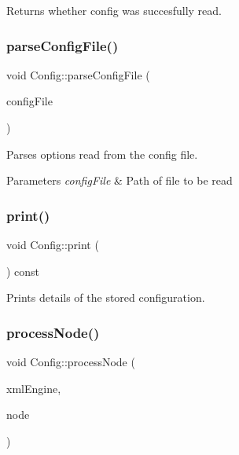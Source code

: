 Returns whether config was succesfully read. 

\mbox{\label{class_config_a3092a6e3ba0458b6bedca09f841f554e}} 
\subsubsection{\texorpdfstring{parse\+Config\+File()}{parseConfigFile()}}
{\footnotesize\ttfamily void Config\+::parse\+Config\+File (\begin{DoxyParamCaption}\item[{const std\+::string}]{config\+File }\end{DoxyParamCaption})\hspace{0.3cm}{\ttfamily [private]}}



Parses options read from the config file. 


\begin{DoxyParams}{Parameters}
{\em config\+File} & Path of file to be read \\
\hline
\end{DoxyParams}
\mbox{\label{class_config_af75cb5a60c6cac9d6f6d030e65a5240a}} 
\subsubsection{\texorpdfstring{print()}{print()}}
{\footnotesize\ttfamily void Config\+::print (\begin{DoxyParamCaption}{ }\end{DoxyParamCaption}) const}



Prints details of the stored configuration. 

\mbox{\label{class_config_a46d81f90a7b6218385e8bfd0a283f6ce}} 
\subsubsection{\texorpdfstring{process\+Node()}{processNode()}}
{\footnotesize\ttfamily void Config\+::process\+Node (\begin{DoxyParamCaption}\item[{T\+X\+M\+L\+Engine $\ast$}]{xml\+Engine,  }\item[{X\+M\+L\+Node\+Pointer\+\_\+t}]{node }\end{DoxyParamCaption})\hspace{0.3cm}{\ttfamily [private]}}



